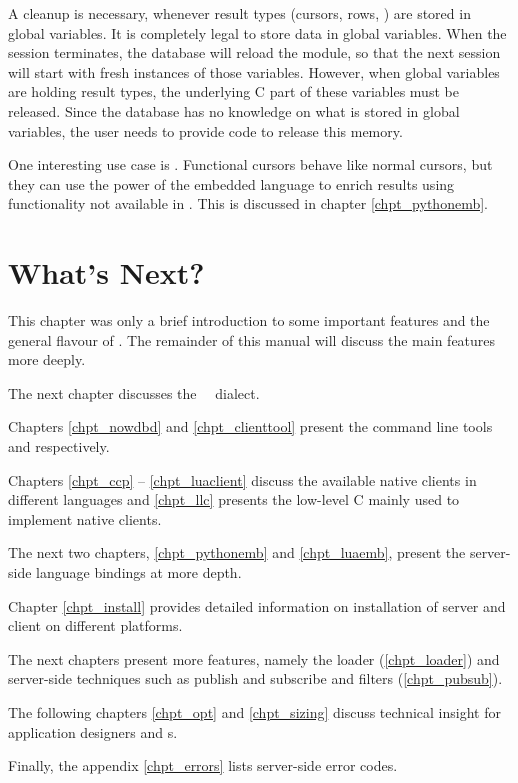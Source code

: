 A cleanup is necessary, whenever result types
(cursors, rows, \etc) are stored in global variables.
It is completely legal to store data in global variables.
When the session terminates, the database will reload
the module, so that the next session will start with
fresh instances of those variables. However, when
global variables are holding result types, the underlying
C part of these variables must be released.
Since the database has no knowledge on what is stored
in global variables, the user needs to provide code
to release this memory.

One interesting use case is .
Functional cursors behave like normal cursors,
but they can use the power of the embedded language
to enrich results
using functionality
not available in \sql.
This is discussed in chapter \ref{chpt_pythonemb}.

\section{What's Next?}
This chapter was only a brief introduction
to some important features and the general flavour 
of \nowdb. The remainder of this manual will
discuss the main features more deeply.

The next chapter discusses the \nowdb\ \sql\ dialect.

Chapters \ref{chpt_nowdbd} and \ref{chpt_clienttool}
present the command line tools 
and  respectively.

Chapters \ref{chpt_ccp} -- \ref{chpt_luaclient}
discuss the available native clients in different
languages and \ref{chpt_llc} presents the low-level
C  mainly used to implement
native clients.

The next two chapters, \ref{chpt_pythonemb} and
\ref{chpt_luaemb}, present the server-side
language bindings at more depth.

Chapter \ref{chpt_install} provides detailed information
on installation of server and client on different
platforms.

The next chapters present more features,
namely the loader (\ref{chpt_loader}) and
server-side techniques such as publish and subscribe and
filters (\ref{chpt_pubsub}).

The following chapters 
\ref{chpt_opt} and \ref{chpt_sizing}
discuss technical insight
for application designers and s.

Finally, the appendix \ref{chpt_errors} lists server-side
error codes.


